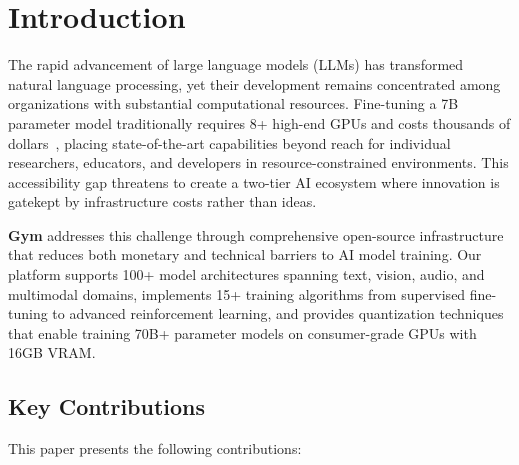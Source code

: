 \section{Introduction}


The rapid advancement of large language models (LLMs) has transformed natural language processing, yet their development remains concentrated among organizations with substantial computational resources. Fine-tuning a 7B parameter model traditionally requires 8+ high-end GPUs and costs thousands of dollars~\citep{touvron2023llama}, placing state-of-the-art capabilities beyond reach for individual researchers, educators, and developers in resource-constrained environments. This accessibility gap threatens to create a two-tier AI ecosystem where innovation is gatekept by infrastructure costs rather than ideas.

\textbf{Gym} addresses this challenge through comprehensive open-source infrastructure that reduces both monetary and technical barriers to AI model training. Our platform supports 100+ model architectures spanning text, vision, audio, and multimodal domains, implements 15+ training algorithms from supervised fine-tuning to advanced reinforcement learning, and provides quantization techniques that enable training 70B+ parameter models on consumer-grade GPUs with 16GB VRAM.

\subsection{Key Contributions}

This paper presents the following contributions:

